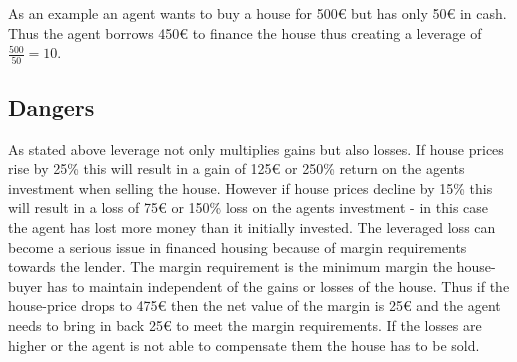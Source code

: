 \documentclass[../Bachelorarbeit.tex]{subfiles}
\begin{document}
As an example an agent wants to buy a house for 500\euro{} but has only 50\euro{} in cash. Thus the agent borrows 450\euro{} to finance the house thus creating a leverage of $\frac{500}{50} = 10$.

\subsection{Dangers}
As stated above leverage not only multiplies gains but also losses. If house prices rise by 25\% this will result in a gain of 125\euro{} or 250\% return on the agents investment when selling the house. However if house prices decline by 15\% this will result in a loss of 75\euro{} or 150\% loss on the agents investment - in this case the agent has lost more money than it initially invested. The leveraged loss can become a serious issue in financed housing because of margin requirements towards the lender. The margin requirement is the minimum margin the house-buyer has to maintain independent of the gains or losses of the house. Thus if the house-price drops to 475\euro{} then the net value of the margin is 25\euro{} and the agent needs to bring in back 25\euro{} to meet the margin requirements. If the losses are higher or the agent is not able to compensate them the house has to be sold.


\end{document}
